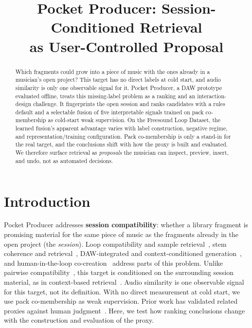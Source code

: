 \documentclass{article}
\title{Pocket Producer: Session-Conditioned Retrieval\\
as User-Controlled Proposal}
\begin{document}
\maketitle

\begin{abstract}
Which fragments could grow into a piece of music with the ones
already in a musician's open project?  This target has no direct labels
at cold start, and audio similarity is only one observable
signal for it.  Pocket Producer, a DAW prototype evaluated offline,
treats this missing-label problem as a ranking and an
interaction-design challenge.  It
fingerprints the open session and ranks candidates with a rules
default and a selectable fusion of five interpretable signals
trained on pack co-membership as cold-start weak supervision.  On the
Freesound Loop Dataset, the learned fusion's apparent advantage
varies with label construction, negative regime, and
representation/training configuration.  Pack co-membership is only a stand-in for the real
target, and the conclusions shift with how the proxy is built
and evaluated.  We therefore surface retrieval as
\emph{proposals} the musician can inspect, preview, insert, and
undo, not as automated decisions.
\end{abstract}

\section{Introduction}\label{sec:intro}

Pocket Producer addresses \textbf{session compatibility}:
whether a library fragment is promising material for the same
piece of music as the fragments already in the open project (the
\emph{session}).
Loop compatibility and sample
retrieval~\cite{chen2020neuralloop,lattner2022samplematch},
stem coherence and
retrieval~\cite{ciranni2025cocola,riou2025stemretrieval},
DAW-integrated and context-conditioned
generation~\cite{he2025tomi,nistal2024diffariff},
and human-in-the-loop co-creation~\cite{elkins2025dawzy} address
parts of this problem.  Unlike pairwise
compatibility~\cite{chen2020neuralloop}, this target is conditioned on the
surrounding session material, as in context-based
retrieval~\cite{lattner2022samplematch,riou2025stemretrieval}.
Audio similarity is one observable signal for this target, not
its definition.  With no direct measurement at cold start, we use
pack co-membership as weak supervision.  Prior work has validated
related proxies against human
judgment~\cite{chen2020neuralloop,lattner2022samplematch}.  Here,
we test how ranking conclusions change with the construction and
evaluation of the proxy.
\end{document}
